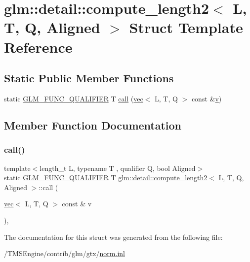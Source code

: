 \hypertarget{structglm_1_1detail_1_1compute__length2}{}\section{glm\+:\+:detail\+:\+:compute\+\_\+length2$<$ L, T, Q, Aligned $>$ Struct Template Reference}
\label{structglm_1_1detail_1_1compute__length2}
\subsection*{Static Public Member Functions}
\begin{DoxyCompactItemize}
\item 
static \hyperlink{setup_8hpp_a33fdea6f91c5f834105f7415e2a64407}{G\+L\+M\+\_\+\+F\+U\+N\+C\+\_\+\+Q\+U\+A\+L\+I\+F\+I\+ER} T \hyperlink{structglm_1_1detail_1_1compute__length2_ac2b815d887a70ae91613c510a6adc07d}{call} (\hyperlink{structglm_1_1vec}{vec}$<$ L, T, Q $>$ const \&\hyperlink{_s_d_l__opengl_8h_a10a82eabcb59d2fcd74acee063775f90}{v})
\end{DoxyCompactItemize}


\subsection{Member Function Documentation}
\mbox{\label{structglm_1_1detail_1_1compute__length2_ac2b815d887a70ae91613c510a6adc07d}} 
\subsubsection{\texorpdfstring{call()}{call()}}
{\footnotesize\ttfamily template$<$length\+\_\+t L, typename T , qualifier Q, bool Aligned$>$ \\
static \hyperlink{setup_8hpp_a33fdea6f91c5f834105f7415e2a64407}{G\+L\+M\+\_\+\+F\+U\+N\+C\+\_\+\+Q\+U\+A\+L\+I\+F\+I\+ER} T \hyperlink{structglm_1_1detail_1_1compute__length2}{glm\+::detail\+::compute\+\_\+length2}$<$ L, T, Q, Aligned $>$\+::call (\begin{DoxyParamCaption}\item[{\hyperlink{structglm_1_1vec}{vec}$<$ L, T, Q $>$ const \&}]{v }\end{DoxyParamCaption})\hspace{0.3cm}{\ttfamily [inline]}, {\ttfamily [static]}}



The documentation for this struct was generated from the following file\+:\begin{DoxyCompactItemize}
\item 
/\+T\+M\+S\+Engine/contrib/glm/gtx/\hyperlink{norm_8inl}{norm.\+inl}\end{DoxyCompactItemize}
